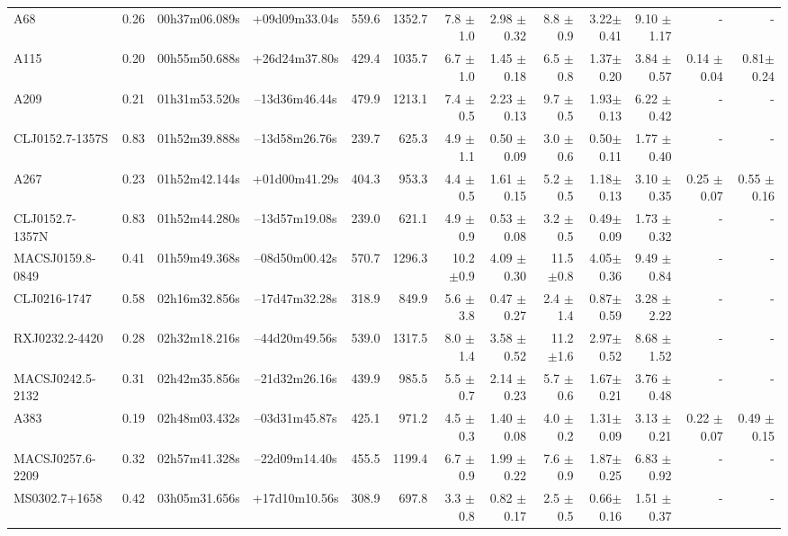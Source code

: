 \documentclass{aa}
\begin{document}
\begin{landscape}
\begin{longtable}{lcccrrrrrrrrr}
A68	 		 &0.26 & 00h37m06.089s &+09d09m33.04s  &  559.6   &  1352.7  &  7.8  $\pm$1.0 & 2.98 $\pm$ 0.32&8.8  $\pm$0.9  & 3.22$\pm$0.41& 9.10 $\pm$1.17& - & -   \\
A115	 		 &0.20 & 00h55m50.688s &+26d24m37.80s  &  429.4   &  1035.7  &  6.7  $\pm$1.0 & 1.45 $\pm$ 0.18&6.5  $\pm$0.8  & 1.37$\pm$0.20& 3.84 $\pm$0.57& 0.14 $\pm$ 0.04&  0.81$\pm$ 0.24\\
A209	 	 	 &0.21 & 01h31m53.520s &--13d36m46.44s  &  479.9   &  1213.1  &  7.4  $\pm$0.5 & 2.23 $\pm$ 0.13&9.7  $\pm$0.5  & 1.93$\pm$0.13& 6.22 $\pm$0.42& - & -   \\
CLJ0152.7-1357S  &0.83 & 01h52m39.888s &--13d58m26.76s  &  239.7   &  625.3     &  4.9  $\pm$1.1 & 0.50 $\pm$ 0.09&3.0  $\pm$0.6  & 0.50$\pm$0.11& 1.77 $\pm$0.40& - 			& -   \\
A267	 		 &0.23 & 01h52m42.144s &+01d00m41.29s  &  404.3   &  953.3   &  4.4  $\pm$0.5 & 1.61 $\pm$ 0.15&5.2  $\pm$0.5  & 1.18$\pm$0.13& 3.10 $\pm$0.35&  0.25 $\pm$ 0.07 & 0.55 $\pm$ 0.16 \\
CLJ0152.7-1357N 	 &0.83  & 01h52m44.280s &--13d57m19.08s   &  239.0   &  621.1   &  4.9  $\pm$0.9 & 0.53 $\pm$ 0.08&3.2  $\pm$0.5  & 0.49$\pm$0.09& 1.73 $\pm$0.32&			-	 &  - \\
MACSJ0159.8-0849&0.41 & 01h59m49.368s &--08d50m00.42s  &  570.7   &  1296.3  &  10.2 $\pm$0.9 & 4.09 $\pm$ 0.30&11.5 $\pm$0.8  & 4.05$\pm$0.36& 9.49 $\pm$0.84& - & -   \\
CLJ0216-1747	 &0.58 & 02h16m32.856s &--17d47m32.28s  &  318.9   &  849.9    &  5.6  $\pm$3.8  & 0.47 $\pm$ 0.27 &2.4    $\pm$1.4  & 0.87$\pm$0.59& 3.28 $\pm$2.22& - & -   \\
RXJ0232.2-4420     &0.28 & 02h32m18.216s &--44d20m49.56s  &  539.0   &  1317.5  &  8.0  $\pm$1.4  & 3.58 $\pm$ 0.52 &11.2 $\pm$1.6  & 2.97$\pm$0.52& 8.68 $\pm$1.52& - & -   \\
MACSJ0242.5-2132 &0.31 & 02h42m35.856s &--21d32m26.16s  &  439.9   &  985.5   &  5.5  $\pm$0.7 & 2.14 $\pm$ 0.23&5.7  $\pm$0.6  & 1.67$\pm$0.21& 3.76 $\pm$0.48& - & -   \\
A383	 	 & 0.19 & 02h48m03.432s &--03d31m45.87s  &  425.1   &  971.2   &  4.5  $\pm$0.3 & 1.40 $\pm$ 0.08&4.0  $\pm$0.2  & 1.31$\pm$0.09& 3.13 $\pm$0.21& 0.22 $\pm$ 0.07& 0.49 $\pm$ 0.15  \\
MACSJ0257.6-2209 & 0.32 & 02h57m41.328s &--22d09m14.40s  &  455.5   &  1199.4  &  6.7  $\pm$0.9 & 1.99 $\pm$ 0.22&7.6  $\pm$0.9  & 1.87$\pm$0.25& 6.83 $\pm$0.92& - & -   \\
MS0302.7+1658   &0.42 & 03h05m31.656s &+17d10m10.56s  &  308.9   &  697.8   &  3.3  $\pm$0.8 & 0.82 $\pm$ 0.17&2.5  $\pm$0.5  & 0.66$\pm$0.16& 1.51 $\pm$0.37& - & -   \\

\end{longtable}
\end{landscape}
\end{document}
